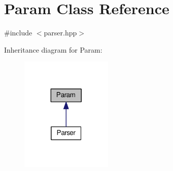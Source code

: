 \hypertarget{classParam}{\section{Param Class Reference}
\label{classParam}
}


{\ttfamily \#include $<$parser.\-hpp$>$}



Inheritance diagram for Param\-:
\nopagebreak
\begin{figure}[H]
\begin{center}
\leavevmode
\includegraphics[width=124pt]{classParam__inherit__graph}
\end{center}
\end{figure}
